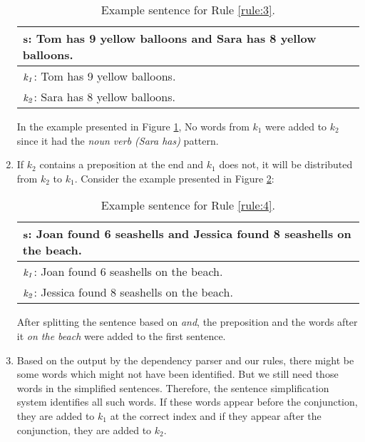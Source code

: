 \documentclass[11pt]{article}
\begin{document}
\begin{enumerate}[topsep=0pt,itemsep=-1ex,partopsep=1ex,parsep=1ex]
\vspace{-0.2cm}
\begin{table}[h!]
\centering
\begin{tabular}{ | m{7cm} | }
\hline
 $\mathbf{\small s}$\textbf{\small : Tom has 9 yellow balloons and Sara has 8 yellow balloons.}\\
\hline
$\mathit{\small k_{1}}$\small : Tom has 9 yellow balloons.\\
\hline
$\mathit{\small k_{2}}$\small : Sara has 8 yellow balloons.\\
\hline
\end{tabular}
\caption{Example sentence for Rule  \ref{rule:3}.}
\label{figure:5}
\end{table}

In the example presented in Figure \ref{figure:5}, No words from $\mathit{k_{1}}$ were added to $\mathit{k_{2}}$ since it had the \textit{noun verb (Sara has)} pattern.

\item \label{rule:4}
If $\mathit{k_{2}}$ contains a preposition at the end and $\mathit{k_{1}}$ does not, it will be distributed from $\mathit{k_{2}}$ to $\mathit{k_{1}}$. Consider the example presented in Figure \ref{figure:6}:
\vspace{-0.2cm}
\begin{table}[h!]
\centering
\begin{tabular}{ | m{7cm} | }
\hline
 $\mathbf{\small s}$\textbf{\small : Joan found 6 seashells and Jessica found 8 seashells on the beach.}\\
\hline
$\mathit{\small k_{1}}$\small : Joan found 6 seashells on the beach.\\
\hline
$\mathit{\small k_{2}}$\small : Jessica found 8 seashells on the beach.\\
\hline
\end{tabular}
\caption{Example sentence for Rule  \ref{rule:4}.}
\label{figure:6}
\end{table}

After splitting the sentence based on \textit{and}, the preposition and the words after it \textit{on the beach} were added to the first sentence.

\item
Based on the output by the dependency parser and our rules, there might be some words which might not have been identified. But we still need those words in the simplified sentences. Therefore, the sentence simplification system identifies all such words. If these words appear before the conjunction, they are added to $\mathit{k_{1}}$ at the correct index and if they appear after the conjunction, they are added to $\mathit{k_{2}}$.

\end{enumerate}
\end{document}
